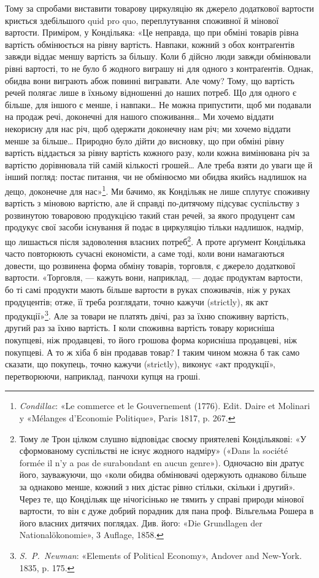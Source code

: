 Тому за спробами виставити товарову циркуляцію як джерело
додаткової вартости криється здебільшого quid pro quo, переплутування
споживної й мінової вартости. Приміром, у Кондільяка:
«Це неправда, що при обміні товарів рівна вартість обмінюється
на рівну вартість. Навпаки, кожний з обох контраґентів завжди
віддає меншу вартість за більшу. Коли б дійсно люди завжди
обмінювали рівні вартості, то не було б жодного виграшу ні для
одного з контраґентів. Однак, обидва вони виграють абож повинні
вигравати. Але чому? Тому, що вартість речей полягає
лише в їхньому відношенні до наших потреб. Що для одного є
більше, для іншого є менше, і навпаки\dots{} Не можна припустити,
щоб ми подавали на продаж речі, доконечні для нашого споживання\dots{}
Ми хочемо віддати некорисну для нас річ, щоб одержати
доконечну нам річ; ми хочемо віддати менше за більше\dots{} Природно
було дійти до висновку, що при обміні рівну вартість віддається
за рівну вартість кожного разу, коли кожна вимінювана
річ за вартістю дорівнювала тій самій кількості грошей\dots{} Але
треба взяти до уваги ще й інший погляд: постає питання, чи не
обмінюємо ми обидва якийсь надлишок на дещо, доконечне для
нас»\footnote{
\emph{Condillac}: «Le commerce et le Gouvernement (1776). Edit. Daire
et Molinari y «Mélanges d’Economie Politique», Paris 1817, p. 267.
}. Ми бачимо, як Кондільяк не лише сплутує споживну
вартість з міновою вартістю, але й справді по-дитячому підсуває
суспільству з розвинутою товаровою продукцією такий стан речей,
за якого продуцент сам продукує свої засоби існування й подає
в циркуляцію тільки надлишок, надмір, що лишається після
задоволення власних потреб\footnote{
Тому ле Трон цілком слушно відповідає своєму приятелеві Кондільякові:
«У сформованому суспільстві не існує жодного надміру»
(«Dans la société formée il n’y a pas de surabondant en aucun genre»).
Одночасно він дратує його, зауважуючи, що «коли обидва обмінювачі
одержують однаково більше за однаково менше, кожний з них дістає
рівно стільки, скільки і другий». Через те, що Кондільяк ще нічогісінько
не тямить у справі природи мінової вартости, то він є дуже добрий порадник
для пана проф. Вільгельма Рошера в його власних дитячих поглядах.
Див. його: «Die Grundlagen der Nationalökonomie», 3 Auflage,
1858.
}. А проте арґумент Кондільяка
часто повторюють сучасні економісти, а саме тоді, коли вони
намагаються довести, що розвинена форма обміну товарів, торговля,
є джерело додаткової вартости. «Торговля, — кажуть вони,
наприклад, — додає продуктам вартости, бо ті самі продукти
мають більше вартости в руках споживачів, ніж у руках продуцентів;
отже, її треба розглядати, точно кажучи (strictly), як
акт продукції»\footnote{
\emph{S.~P.~Newman}: «Elements of Political Economy», Andover and
New-York. 1835, p. 175.
}. Але за товари не платять двічі, раз за їхню
споживну вартість, другий раз за їхню вартість. І коли споживна
вартість товару корисніша покупцеві, ніж продавцеві, то його
грошова форма корисніша продавцеві, ніж покупцеві. А то ж
хіба б він продавав товар? І таким чином можна б так само сказати,
що покупець, точно кажучи (strictly), виконує «акт продукції»,
перетворюючи, наприклад, панчохи купця на гроші.

